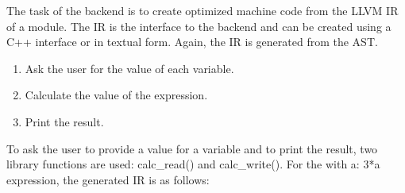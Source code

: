 
The task of the backend is to create optimized machine code from the LLVM IR of a module. The IR is the interface to the backend and can be created using a C++ interface or in textual form. Again, the IR is generated from the AST.


\begin{enumerate}
\item
Ask the user for the value of each variable.

\item
Calculate the value of the expression.

\item
Print the result.
\end{enumerate}

To ask the user to provide a value for a variable and to print the result, two library functions are used: calc\_read() and calc\_write().  For the with a: 3*a expression, the generated IR is as follows:


